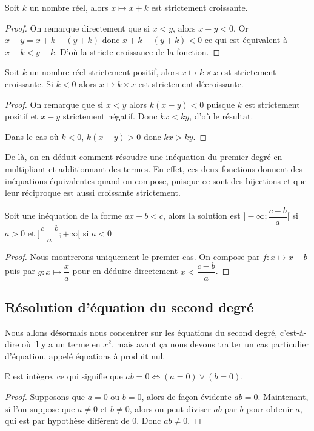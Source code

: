 \begin{prop}
    Soit $k$ un nombre réel, alors $x\mapsto x + k$ est strictement croissante.
\end{prop}
\begin{proof}
    On remarque directement que si $x<y$, alors $x-y<0$. Or $x-y=x+k-(y+k)$ donc $x+k-(y+k)<0$ ce qui est équivalent à $x+k<y+k$. D'où la stricte croissance de la fonction.
\end{proof}

\begin{prop}
    Soit $k$ un nombre réel strictement positif, alors $x\mapsto k\times x$ est strictement croissante. Si $k<0$ alors $x\mapsto k\times x$ est strictement décroissante.
\end{prop}
\begin{proof}
    On remarque que si $x<y$ alors $k(x-y)<0$ puisque $k$ est strictement positif et $x-y$ strictement négatif. Donc $kx<ky$, d'où le résultat.
    
    Dans le cas où $k<0$, $k(x-y)>0$ donc $kx>ky$.
\end{proof}

De là, on en déduit comment résoudre une inéquation du premier degré en multipliant et additionnant des termes. En effet, ces deux fonctions donnent des inéquations équivalentes quand on compose, puisque ce sont des bijections et que leur réciproque est aussi croissante strictement.

\begin{them}
    Soit une inéquation de la forme $ax+b<c$, alors la solution est $]-\infty ; \dfrac{c-b}{a}[$ si $a>0$ et $]\dfrac{c-b}{a};+\infty[$ si $a<0$
\end{them}
\begin{proof}
    Nous montrerons uniquement le premier cas. On compose par $f : x \mapsto x-b$ puis par $g : x \mapsto \dfrac{x}{a}$ pour en déduire directement $x<\dfrac{c-b}{a}$.
\end{proof}

\subsection{Résolution d'équation du second degré}

Nous allons désormais nous concentrer sur les équations du second degré, c'est-à-dire où il y a un terme en $x^2$, mais avant ça nous devons traiter un cas particulier d'équation, appelé équations à produit nul.

\begin{them}
    $\mathbb R$ est intègre, ce qui signifie que $ab=0 \iff (a=0)\lor (b=0)$.
\end{them}
\begin{proof}
    Supposons que $a=0$ ou $b=0$, alors de façon évidente $ab=0$. Maintenant, si l'on suppose que $a\neq 0$ et $b\neq 0$, alors on peut diviser $ab$ par $b$ pour obtenir $a$, qui est par hypothèse différent de $0$. Donc $ab\neq 0$.
\end{proof}

